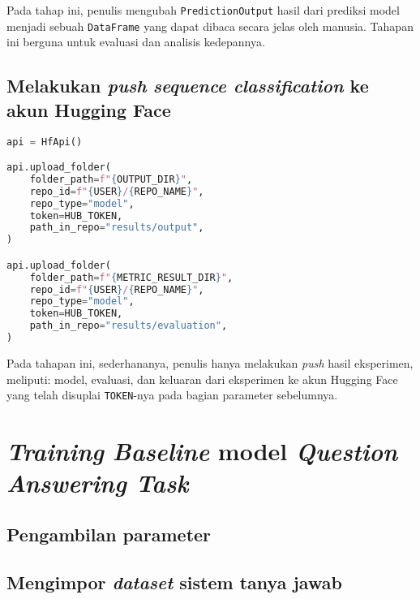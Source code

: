 Pada tahap ini, penulis mengubah \texttt{PredictionOutput} hasil dari prediksi model menjadi sebuah \texttt{DataFrame} yang dapat dibaca secara jelas oleh manusia. Tahapan ini berguna untuk evaluasi dan analisis kedepannya.

\subsection{Melakukan \emph{push} \emph{sequence classification} ke akun Hugging Face}
\begin{lstlisting}[language=Python, caption=Melakukan \emph{push} \emph{sequence classification} ke akun Hugging Face]
api = HfApi()

api.upload_folder(
    folder_path=f"{OUTPUT_DIR}",
    repo_id=f"{USER}/{REPO_NAME}",
    repo_type="model",
    token=HUB_TOKEN,
    path_in_repo="results/output",
)

api.upload_folder(
    folder_path=f"{METRIC_RESULT_DIR}",
    repo_id=f"{USER}/{REPO_NAME}",
    repo_type="model",
    token=HUB_TOKEN,
    path_in_repo="results/evaluation",
)
\end{lstlisting}

Pada tahapan ini, sederhananya, penulis hanya melakukan \emph{push} hasil eksperimen, meliputi: model, evaluasi, dan keluaran dari eksperimen ke akun Hugging Face yang telah disuplai \texttt{TOKEN}-nya pada bagian parameter sebelumnya.

\section{\emph{Training} \emph{Baseline} model \emph{Question Answering Task}}

\subsection{Pengambilan parameter}

\subsection{Mengimpor \emph{dataset} sistem tanya jawab}

